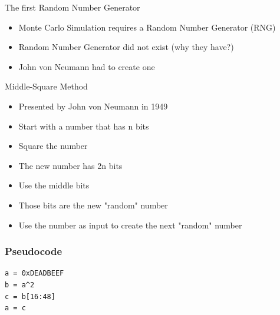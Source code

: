 \documentclass[utf8]{beamer}
\begin{document}
\begin{frame}{The first Random Number Generator}
\begin{itemize}
\item Monte Carlo Simulation requires a Random Number Generator (RNG)
\item Random Number Generator did not exist (why they have?)
\item John von Neumann had to create one
\end{itemize}
\end{frame}

\begin{frame}{Middle-Square Method}
\begin{itemize}
\item Presented by John von Neumann in 1949
\item Start with a number that has n bits
\item Square the number
\item The new number has 2n bits
\item Use the middle bits
\item Those bits are the new "random" number
\item Use the number as input to create the next "random" number
\end{itemize}
\end{frame}

\begin{frame}[fragile]
\frametitle{Pseudocode}
\begin{verbatim}
a = 0xDEADBEEF
b = a^2
c = b[16:48]
a = c
\end{verbatim}
\end{frame}
\end{document}
